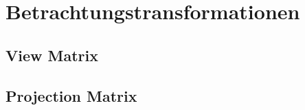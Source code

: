 \chapter{Betrachtungstransformationen}

\section{View Matrix}

\section{Projection Matrix}
\label{projection}
